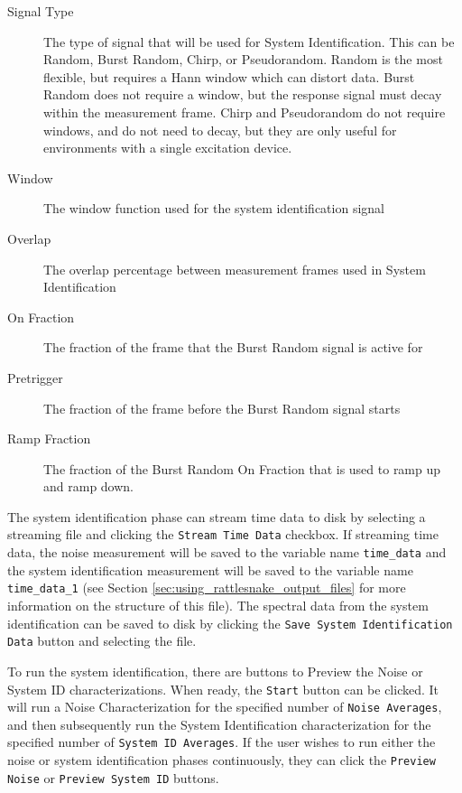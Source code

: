 \documentclass[pdf,12pt,report]{SANDreport}
\newcommand{\inlineCode}{\lstinline[basicstyle=\bfseries\ttfamily]}
\begin{document}
    \begin{description}
        \item[Signal Type] The type of signal that will be used for System Identification.  This can be Random, Burst Random, Chirp, or Pseudorandom.  Random is the most flexible, but requires a Hann window which can distort data.  Burst Random does not require a window, but the response signal must decay within the measurement frame.  Chirp and Pseudorandom do not require windows, and do not need to decay, but they are only useful for environments with a single excitation device.
        \item[Window] The window function used for the system identification signal
        \item[Overlap] The overlap percentage between measurement frames used in System Identification
        \item[On Fraction] The fraction of the frame that the Burst Random signal is active for
        \item[Pretrigger] The fraction of the frame before the Burst Random signal starts
        \item[Ramp Fraction] The fraction of the Burst Random On Fraction that is used to ramp up and ramp down.
    \end{description}

    The system identification phase can stream time data to disk by selecting a streaming file and clicking the \inlineCode{Stream Time Data} checkbox.  If streaming time data, the noise measurement will be saved to the variable name \inlineCode{time_data} and the system identification measurement will be saved to the variable name \inlineCode{time_data_1} (see Section \ref{sec:using_rattlesnake_output_files} for more information on the structure of this file).  The spectral data from the system identification can be saved to disk by clicking the \inlineCode{Save System Identification Data} button and selecting the file.
    
    To run the system identification, there are buttons to Preview the Noise or System ID characterizations.  When ready, the \inlineCode{Start} button can be clicked.  It will run a Noise Characterization for the specified number of \inlineCode{Noise Averages}, and then subsequently run the System Identification characterization for the specified number of \inlineCode{System ID Averages}.  If the user wishes to run either the noise or system identification phases continuously, they can click the \inlineCode{Preview Noise} or \inlineCode{Preview System ID} buttons.
    
\end{document}
